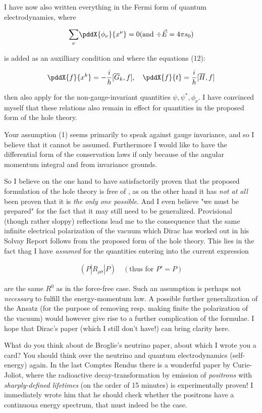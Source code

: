 \documentclass{article}
\newcommand{\uequ}[1]{
\begin{align*}
#1
\end{align*}
}
\newcommand{\sumX}[1]{\underset{#1}{\sum}}
\begin{document}
 I have now also written everything in the Fermi form of quantum electrodynamics, where
\uequ{
\sumX{\nu}\pddX{\phi_\nu}{x^\nu} = 0 (\text{and $\div{\vec{E}} = 4\pi s_0$})
}
is added as an auxilliary condition and where the equations (12):
\uequ{
\pddX{f}{x^k} = -\frac{i}{h}[\overline{G}_k, f], \quad
\pddX{f}{t}   =  \frac{i}{h}[\overline{H}, f]
}
then also apply for the non-gauge-invariant quantities $\psi,\psi^*,\phi_\nu$. I have convinced myself that these relations also remain in effect for  quantities in the proposed form of the hole theory.

Your assumption (1) seems primarily to speak against gauge invariance, and so I believe that it cannot be assumed. Furthermore I would like to have the differential form of the conservation laws if only because of the angular momentum integral and from invariance grounds.

So I believe on the one hand to have satisfactorily proven that the proposed formulation of the hole theory is free of , as on the other hand it has \textit{not at all} been proven that it is \textit{the only one possible}.
And I even believe "we must be prepared" for the fact that it may still need to be generalized. Provisional (though rather sloppy) reflections lead me to the consequence that the same infinite electrical polarization of the vacuum which Dirac has worked out in his Solvay Report follows from the proposed form of the hole theory. This lies in the fact thag I have \textit{assumed} for the quantities entering into the current expression
\uequ{
(P|R_{\rho\sigma}|P)\quad (\text{thus for $P'=P$})
}
are the same $R^0$ as in the force-free case. Such an assumption is perhaps not \textit{necessary} to fulfill the energy-momentum law. A possible further generalization of the Ansatz (for the purpose of removing resp. making finite the polarization of the vacuum) would however give rise to a further complication of the formulae. I hope that Dirac's paper (which I still don't have!) can bring clarity here.

What do you think about de Broglie's neutrino paper, about which I wrote you a card? You should think over the neutrino and quantum electrodynamics (self-energy) again. In the last Comptes Rendus there is a wonderful paper by Curie-Joliot, where the radioactive decay-transformation by emission of \textit{positrons} with \textit{sharply-defined lifetimes} (on the order of 15 minutes) is experimentally proven! I immediately wrote him that he should check whether the positrons have a continuoua energy spectrum, that must indeed be the case.
\end{document}
